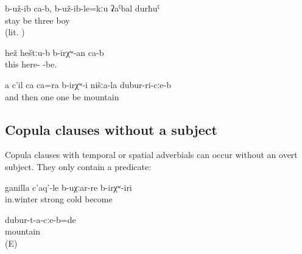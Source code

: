 \begin{exe}
		\ex	\label{ex:‎‎‎Once upon a time there were three boys}
	\gll	b-už-ib	ca-b,	b-už-ib-le=kːu	ʡaˁbal	durħuˁ\\
		stay		be	three	boy\\
	\glt	{} (lit. )
	
	 \ex	\label{This (picture) must be here.}	
\gll hež	heštːu-b	b-irχʷ-an	ca-b \\
this	here-	-be.	 \\
 \glt	{}
 
 	\ex	\label{ex:‎We had another thing in the mountains}
	\gll	a	c'il	ca	ca=ra	b-irχʷ-i	nišːa-la	dubur-ri-cːe-b\\
		and	then	one	one	be		mountain\\
	\glt	{}
 \end{exe}



\subsection{Copula clauses without a subject}
\label{ssec:Copula clauses without a subject}

Copula clauses with temporal or spatial adverbials can occur without an overt  subject. They only contain a  predicate:

\begin{exe}
	\ex	\label{ex:It used to be very cold in the winter}
	\gll	ganilla	c'aq'-le	b-uχːar-re	b-irχʷ-iri\\
		in.winter	strong	cold	become\\
	\glt	{}

	\ex	\label{ex:‎It was in the mountains.}
	\gll	dubur-t-a-cːe-b=de\\
		mountain\\
	\glt	{} (E)
\end{exe}

